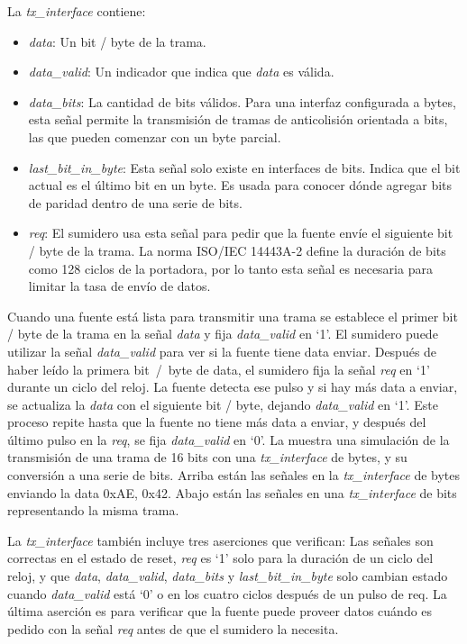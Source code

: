 \documentclass[a4paper, twoside, 11pt]{report}
\begin{document}
\FloatBarrier

La \textit{tx\_interface} contiene:

\begin{itemize}
  \item \textit{data}: Un bit / byte de la trama.
  \item \textit{data\_valid}: Un indicador que indica que \textit{data} es válida.
  \item \textit{data\_bits}: La cantidad de bits válidos. Para una interfaz configurada a bytes, esta señal permite la transmisión de tramas de anticolisión orientada a bits, las que pueden comenzar con un byte parcial.
  \item \textit{last\_bit\_in\_byte}: Esta señal solo existe en interfaces de bits. Indica que el bit actual es el último bit en un byte. Es usada para conocer dónde agregar bits de paridad dentro de una serie de bits.
  \item \textit{req}: El sumidero usa esta señal para pedir que la fuente envíe el siguiente bit / byte de la trama. La norma ISO/IEC 14443A-2 define la duración de bits como 128 ciclos de la portadora, por lo tanto esta señal es necesaria para limitar la tasa de envío de datos.
\end{itemize}

Cuando una fuente está lista para transmitir una trama se establece el primer bit / byte de la trama en la señal \textit{data} y fija \textit{data\_valid} en ‘1’. El sumidero puede utilizar la señal \textit{data\_valid} para ver si la fuente tiene data enviar. Después de haber leído la primera bit~/~byte de data, el sumidero fija la señal \textit{req} en ‘1’ durante un ciclo del reloj. La fuente detecta ese pulso y si hay más data a enviar, se actualiza la \textit{data} con el siguiente bit / byte, dejando \textit{data\_valid} en ‘1’. Este proceso repite hasta que la fuente no tiene más data a enviar, y después del último pulso en la \textit{req}, se fija \textit{data\_valid} en ‘0’. La  muestra una simulación de la transmisión de una trama de 16 bits con una \textit{tx\_interface} de bytes, y su conversión a una serie de bits. Arriba están las señales en la \textit{tx\_interface} de bytes enviando la data 0xAE, 0x42. Abajo están las señales en una \textit{tx\_interface} de bits representando la misma trama.

La \textit{tx\_interface} también incluye tres aserciones que verifican: Las señales son correctas en el estado de reset, \textit{req} es ‘1’ solo para la duración de un ciclo del reloj, y que \textit{data}, \textit{data\_valid}, \textit{data\_bits} y \textit{last\_bit\_in\_byte} solo cambian estado cuando \textit{data\_valid} está ‘0’ o en los cuatro ciclos después de un pulso de req. La última aserción es para verificar que la fuente puede proveer datos cuándo es pedido con la señal \textit{req} antes de que el sumidero la necesita.
\end{document}
